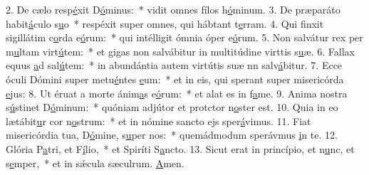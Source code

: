 2. De cælo resp\uline{é}xit D\uline{ó}minus:~* vidit omnes fílos h\uline{ó}minum.
3. De præparáto habit\uline{á}culo s\uline{u}o~* respéxit super omnes, qui hábtant t\uline{e}rram.
4. Qui finxit sigillátim c\uline{o}rda e\uline{ó}rum:~* qui intélligit ómnia óper e\uline{ó}rum.
5. Non salvátur rex per m\uline{u}ltam virt\uline{ú}tem:~* et gigas non salvábitur in multitúdine virttis s\uline{u}æ.
6. Fallax equus \uline{a}d sal\uline{ú}tem:~* in abundántia autem virtútis suæ nn salv\uline{á}bitur.
7. Ecce óculi Dómini super metu\uline{é}ntes \uline{e}um:~* et in eis, qui sperant super misericórda \uline{e}jus:
8. Ut éruat a morte ánim\uline{a}s e\uline{ó}rum:~* et alat es in f\uline{a}me.
9. Anima nostra s\uline{ú}stinet D\uline{ó}minum:~* quóniam adjútor et protctor n\uline{o}ster est.
10. Quia in eo lætábit\uline{u}r cor n\uline{o}strum:~* et in nómine sancto ejs sper\uline{á}vimus.
11. Fiat misericórdia tua, D\uline{ó}mine, s\uline{u}per nos:~* quemádmodum sperávmus \uline{i}n te.
12. Glória P\uline{a}tri, et F\uline{í}lio,~* et Spiríti S\uline{a}ncto.
13. Sicut erat in princípio, et n\uline{u}nc, et s\uline{e}mper,~* et in sǽcula sæculrum. \uline{A}men.
